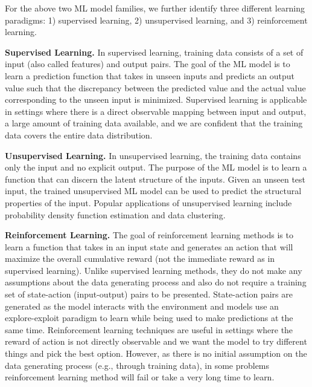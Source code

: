 \vspace{2mm}
For the above two ML model families, we further identify three different learning paradigms: 1) supervised learning, 2) unsupervised learning, and 3) reinforcement learning.

\vspace{2mm}
\noindent \textbf{Supervised Learning. } In supervised learning, training data consists of a set of input (also called features) and output pairs.
The goal of the ML model is to learn a prediction function that takes in unseen inputs and predicts an output value such that the discrepancy between the predicted value and the actual value corresponding to the unseen input is minimized.
Supervised learning is applicable in settings where there is a direct observable mapping between input and output, a large amount of training data available, and we are confident that the training data covers the entire data distribution.

\vspace{2mm}
\noindent \textbf{Unsupervised Learning. } In unsupervised learning, the training data contains only the input and no explicit output.
The purpose of the ML model is to learn a function that can discern the latent structure of the inputs.
Given an unseen test input, the trained unsupervised ML model can be used to predict the structural properties of the input.
Popular applications of unsupervised learning include probability density function estimation and data clustering.

\vspace{2mm}
\noindent \textbf{Reinforcement Learning. } The goal of reinforcement learning methods is to learn a function that takes in an input state and generates an action that will maximize the overall cumulative reward (not the immediate reward as in supervised learning).
Unlike supervised learning methods, they do not make any assumptions about the data generating process and also do not require a training set of state-action (input-output) pairs to be presented.
State-action pairs are generated as the model interacts with the environment and models use an explore-exploit paradigm to learn while being used to make predictions at the same time.
Reinforcement learning techniques are useful in settings where the reward of action is not directly observable and we want the model to try different things and pick the best option.
However, as there is no initial assumption on the data generating process (e.g., through training data), in some problems reinforcement learning method will fail or take a very long time to learn.